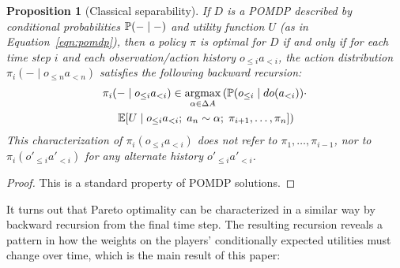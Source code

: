 \documentclass{article}
\newcommand{\hist}[1]{o_{\le #1}a_{<#1}}
\newcommand{\althist}[1]{o'_{\le #1}a'_{<#1}}
\newcommand{\dohist}[1]{o_{\le #1} \mid do(a_{<#1})}
\newcommand{\eqn}[1]{Equation~\ref{eqn:#1}}
\DeclareMathOperator*{\argmax}{argmax}
\newtheorem{proposition}[theorem]{Proposition}
\begin{document}
\begin{proposition}[Classical separability]\label{prop:separability}
If $D$ is a POMDP described by conditional probabilities $\mathbb{P}(-\mid -)$ and utility function $U$ (as in \eqn{pomdp}), then a policy $\pi$ is optimal for $D$ if and only if for each time step $i$ and each observation/action history $\hist{i}$, the action distribution $\pi_i(-\mid \hist{n})$ satisfies the following backward recursion:
\begin{multline*}
 \pi_i(-\mid\hist{i}) \in \argmax_{\alpha\in\Delta A}\left( \PP(\dohist{i})\cdot \right. \\ \left.\EE[U \mid \hist{i} ;\; a_n\sim \alpha; \; \pi_{i+1},\ldots,\pi_{n}] \right)
\end{multline*}
This characterization of $\pi_i(\hist{i})$ does not refer to $\pi_1,\ldots,\pi_{i-1}$, nor to 
$\pi_i(\althist{i})$ for any alternate history $\althist{i}$.
\end{proposition}

\begin{proof}
This is a standard property of POMDP solutions.
\end{proof}

It turns out that Pareto optimality can be characterized in a similar way by backward recursion from the final time step.  The resulting recursion reveals a pattern in how the weights on the players' conditionally expected utilities must change over time, which is the main result of this paper:
\end{document}
